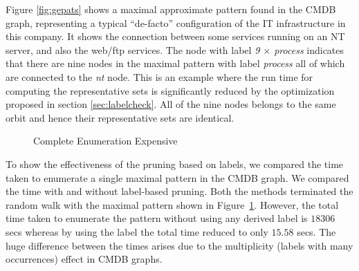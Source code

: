 \smallskip{}
Figure \ref{fig:gepats} shows a maximal approximate
pattern found in the CMDB graph, representing a
typical ``de-facto'' 
configuration of the IT infrastructure in this company. It shows the
connection between some services running on an NT server, and also the
web/ftp services. The node with label \textit{9 $\times$ process} 
indicates that there are nine nodes 
in the maximal pattern with label \textit{process} all of which
are connected to the \textit{nt} node. This is an example where the run time
for computing the representative sets is significantly reduced by
the optimization proposed in section \ref{sec:labelcheck}. All of the nine
nodes belongs to the same orbit and hence their representative sets are
identical.


\begin{figure}
    \centering
\vspace{-0.1in}
    \caption{Complete Enumeration Expensive}
    \label{fig:geex}
\vspace{-0.1in}
\end{figure}

To show the effectiveness of the pruning based on labels, we compared
the time taken to enumerate a single maximal pattern in the CMDB graph.
We compared the time with and without label-based pruning.
Both the methods terminated the random walk with the maximal pattern
shown in Figure~\ref{fig:geex}.  
However, the total time taken to enumerate the pattern
without using any derived label is $18306$ secs whereas by using the
\ncl label the total time reduced to only $15.58$ secs. The huge
difference between the times arises due to the multiplicity (labels
with many occurrences) effect in
CMDB graphs.  


